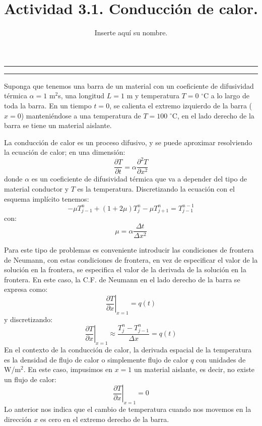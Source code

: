 \documentclass[11pt,a4paper]{article}
\title{Actividad 3.1. Conducción de calor.}
\author{Inserte aquí su nombre.}
\begin{document}
\hrule
\begin{center}


\bigskip
\hrule
\end{center}


Suponga que tenemos una barra de un material con un coeficiente de difusividad térmica $\alpha= 1$ m$^2$s, una longitud $L = 1$ m y temperatura $T=0$ $^{\circ}$C a lo largo de toda la barra. En un tiempo $t=0$, se calienta el extremo izquierdo de la barra ($x=0$) manteniéndose a una temperatura de $T=100$ $^{\circ}$C, en el lado derecho de la barra se tiene un material aislante.

La conducción de calor es un proceso difusivo, y se puede aproximar resolviendo la ecuación de calor; en una dimensión:
\begin{equation}
\frac{\partial T}{\partial t} = \alpha \frac{\partial^2 T}{\partial x^2}
\end{equation}
donde $\alpha$ es un coeficiente de difusividad térmica que va a depender del tipo de material conductor y $T$ es la temperatura. Discretizando la ecuación con el esquema implícito tenemos:
$$
-\mu T_{j-1}^{n}+(1+2 \mu) T_{j}^{n}-\mu T_{j+1}^{n}=T_{j-1}^{n-1}
$$
con:
$$
\mu = \alpha \frac{\Delta t}{\Delta x^2}
$$

Para este tipo de problemas es conveniente introducir las condiciones de frontera de Neumann, con estas condiciones de frontera, en vez de especificar el valor de la solución en la frontera, se especifica el valor de la derivada de la solución en la frontera.
En este caso, la C.F. de Neumann en el lado derecho de la barra se expresa como:
\begin{equation}
\left. \frac{\partial T}{\partial x} \right|_{x = 1} = q(t)
\end{equation}
y discretizando:
\begin{equation}
\left. \frac{\partial T}{\partial x} \right|_{x=1} \approx \frac{T^n_j - T^n_{j-1}}{\Delta x} = q(t)
\end{equation}
En el contexto de la conducción de calor, la derivada espacial de la temperatura es la densidad de flujo de calor o simplemente flujo de calor $ q $ con unidades de W/m$^2$. En este caso, impusimos en $ x = 1 $ un material aislante, es decir, no existe un flujo de calor:
\begin{equation}
\left. \frac{\partial T}{\partial x} \right|_{x=1} = 0
\end{equation}
Lo anterior nos indica que el cambio de temperatura cuando nos movemos en la dirección $ x $ es cero en el extremo derecho de la barra.
\end{document}
